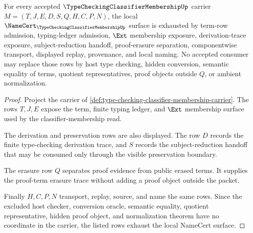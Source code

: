 \begin{theorem}
\label{thm:type-checking-classifier-membership-namecert-obligations}
For every accepted $\TypeCheckingClassifierMembershipUp$ carrier $M=(T,J,E,D,S,Q,H,C,P,N)$, the local $\NameCert_{\TypeCheckingClassifierMembershipUp}$ surface is exhausted by term-row admission, typing-ledger admission, $\Ext$ membership exposure, derivation-trace exposure, subject-reduction handoff, proof-erasure separation, componentwise transport, displayed replay, provenance, and local naming. No accepted consumer may replace those rows by host type checking, hidden conversion, semantic equality of terms, quotient representatives, proof objects outside $Q$, or ambient normalization.
\end{theorem}
\begin{proof}
Project the carrier of \autoref{def:type-checking-classifier-membership-carrier}. The rows $T,J,E$ expose the term, finite typing ledger, and $\Ext$ membership surface used by the classifier-membership read.

The derivation and preservation rows are also displayed. The row $D$ records the finite type-checking derivation trace, and $S$ records the subject-reduction handoff that may be consumed only through the visible preservation boundary.

The erasure row $Q$ separates proof evidence from public erased terms. It supplies the proof-term erasure trace without adding a proof object outside the packet.

Finally $H,C,P,N$ transport, replay, source, and name the same rows. Since the excluded host checker, conversion oracle, semantic equality, quotient representative, hidden proof object, and normalization theorem have no coordinate in the carrier, the listed rows exhaust the local NameCert surface.
\end{proof}

